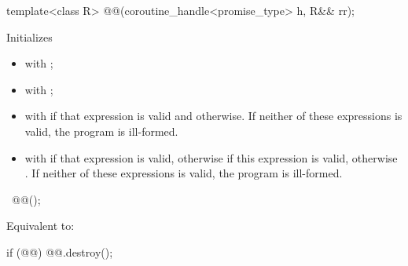 %
\begin{itemdecl}
template<class R>
  @@(coroutine_handle<promise_type> h, R&& rr);
\end{itemdecl}
\begin{itemdescr}
\pnum
\effects
Initializes
\begin{itemize}
\item {} with ;
\item {} with ;
\item {}
with  if that expression
is valid and  otherwise.
If neither of these expressions is valid, the program is ill-formed.
\item {} with
 if that expression is
valid, otherwise 
if this expression is valid, otherwise .
If neither of these expressions is valid, the program is ill-formed.
\end{itemize}
\end{itemdescr}

%
\begin{itemdecl}
~@@();
\end{itemdecl}
\begin{itemdescr}
\pnum
\effects
Equivalent to:
\begin{codeblock}
if (@@)
  @@.destroy();
\end{codeblock}
\end{itemdescr}

